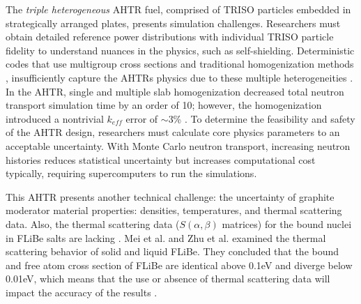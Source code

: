The \emph{triple heterogeneous} \gls{AHTR} fuel, comprised of \gls{TRISO} 
particles embedded in strategically arranged plates, presents simulation 
challenges. 
Researchers must obtain detailed reference power distributions with individual 
\gls{TRISO} particle fidelity to understand nuances in the physics, such 
as self-shielding.
Deterministic codes that use multigroup cross sections and traditional 
homogenization methods \cite{ramey_monte_2018}, insufficiently capture the 
\glspl{AHTR} physics due to these multiple heterogeneities 
\cite{ramey_monte_2018}. 
In the \gls{AHTR}, single and multiple slab homogenization decreased total 
neutron transport simulation time by an order of 10; however, the homogenization 
introduced a nontrivial $k_{eff}$ error of $\sim$3\% 
\cite{ramey_monte_2018, cisneros_neutronics_2013}.
To determine the feasibility and safety of the \gls{AHTR} design, researchers 
must calculate core physics parameters to an acceptable uncertainty. 
With Monte Carlo neutron transport, increasing neutron histories reduces statistical 
uncertainty but increases computational cost typically, requiring
supercomputers to run the simulations.

This \gls{AHTR} presents another technical challenge: the uncertainty of 
graphite moderator material properties: densities, temperatures, and thermal 
scattering data.
Also, the thermal scattering data ($S(\alpha,\beta)$ matrices) for 
the bound nuclei in \gls{FLiBe} salts are lacking \cite{ramey_monte_2018}. 
Mei et al. \cite{mei_investigation_2013} and Zhu et al. \cite{zhu_thermal_2017} 
examined the thermal scattering behavior of solid and liquid \gls{FLiBe}.
They concluded that the bound and free atom cross section of \gls{FLiBe} are 
identical above 0.1eV and diverge below 0.01eV, which means that the use or 
absence of thermal scattering data will impact the accuracy of the results 
\cite{ramey_monte_2018}. 


